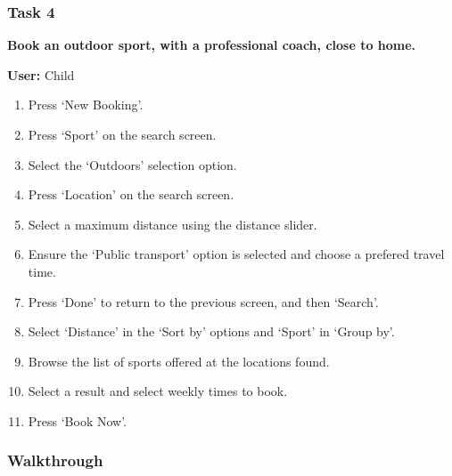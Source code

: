 \subsubsection{Task 4}
\label{ssub:task_4}

\textbf{Book an outdoor sport, with a professional coach, close to home.}

\textbf{User:} Child
\begin{enumerate}
	\item Press `New Booking'.
	\item Press `Sport' on the search screen.
	\item Select the `Outdoors' selection option.
	\item Press `Location' on the search screen.
	\item Select a maximum distance using the distance slider.
	\item Ensure the `Public transport' option is selected and choose a
		prefered travel time.
	\item Press `Done' to return to the previous screen, and then `Search'.
	\item Select `Distance' in the `Sort by' options and `Sport' in `Group by'.
	\item Browse the list of sports offered at the locations found.
	\item Select a result and select weekly times to book.
	\item Press `Book Now'.
\end{enumerate}

\subsubsection{Walkthrough}

